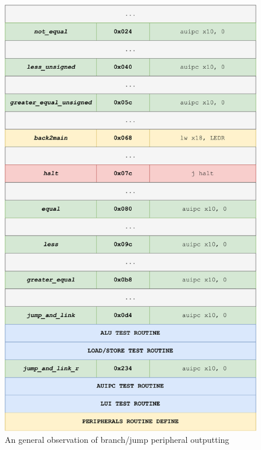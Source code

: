 \documentclass[12pt,a4paper,oneside]{book} %
\begin{document}
 \begin{figure}[H]
    \begin{center}
    \includegraphics[trim=0cm 0cm 0cm 0cm,clip,width=.88\textwidth]{images/testbench_struct_asm.drawio.pdf}
    \caption{An general observation of branch/jump peripheral outputting}
    \end{center}
\end{figure}
\end{document}

